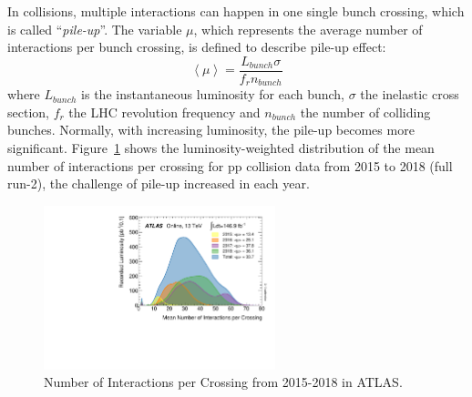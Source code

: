 In collisions, multiple interactions can happen in one single bunch crossing, which is called “\textit{pile-up}”.
The variable $\mu$, which represents the average number of interactions per bunch crossing, 
is defined to describe pile-up effect:
\begin{equation}
	\left< \mu \right> = \frac{L_{bunch}\sigma}{f_{r}n_{bunch}}
\end{equation}
where $L_{bunch}$ is the instantaneous luminosity for each bunch, $\sigma$ the inelastic cross section,
$f_{r}$ the LHC revolution frequency and $n_{bunch}$ the number of colliding bunches.
Normally, with increasing luminosity, the pile-up becomes more significant.
Figure~\ref{fig:run2_mu} shows the luminosity-weighted distribution of the mean number of interactions per crossing
for pp collision data from 2015 to 2018 (full run-2), the challenge of pile-up increased in each year.
\begin{figure}[!htb]
  \centering
  \includegraphics[width=0.6\textwidth]{figures/Detector/mu_2015_2018.pdf}
  \caption{Number of Interactions per Crossing from 2015-2018 in ATLAS.}
  \label{fig:run2_mu}
\end{figure}
